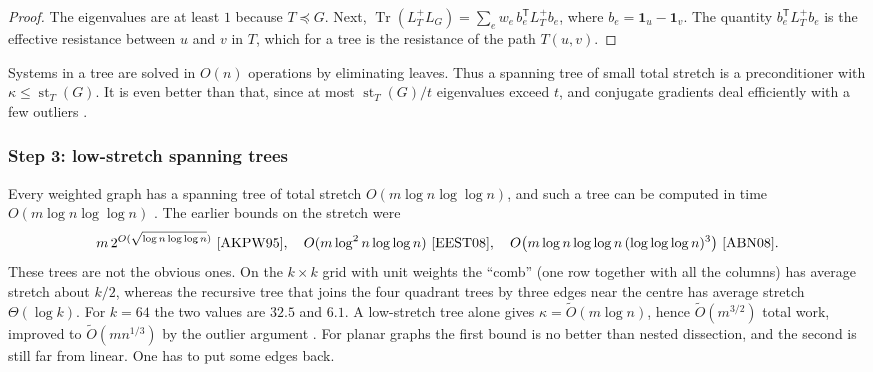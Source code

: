 \documentclass[11pt]{amsart}
\theoremstyle{definition}
\theoremstyle{remark}
\newcommand{\st}{\operatorname{st}}
\newcommand{\Tr}{\operatorname{Tr}}
\newcommand{\Ot}{\widetilde{O}}
\newcommand{\lo}{\preccurlyeq}
\begin{document}
\begin{proof}
The eigenvalues are at least $1$ because $T\lo G$. Next, $\Tr(L_T^{+}L_G)=\sum_ew_e\,b_e^{\mathsf T}L_T^{+}b_e$, where $b_e=\mathbf 1_u-\mathbf 1_v$. The quantity $b_e^{\mathsf T}L_T^{+}b_e$ is the effective resistance between $u$ and $v$ in $T$,
which for a tree is the resistance of the path $T(u,v)$.
\end{proof}

Systems in a tree are solved in $O(n)$ operations by eliminating leaves. Thus a spanning tree of small total stretch is a preconditioner with $\kappa\le\st_T(G)$. It is even better than that,
since at most $\st_T(G)/t$ eigenvalues exceed $t$, and conjugate gradients deal efficiently with a few outliers \cite{SW09}.

\subsubsection*{Step 3: low-stretch spanning trees}
Every weighted graph has a spanning tree of total stretch $O(m\log n\log\log n)$, and such a tree can be computed in time $O(m\log n\log\log n)$ \cite{AN12}.
The earlier bounds on the stretch were
\[
m\,2^{O(\sqrt{\log n\log\log n})}\ \text{\cite{AKPW95}},\quad O(m\log^2n\log\log n)\ \text{\cite{EEST08}},\quad O\bigl(m\log n\log\log n\,(\log\log\log n)^3\bigr)\ \text{\cite{ABN08}}.
\]
These trees are not the obvious ones. On the $k\times k$ grid with unit weights the ``comb'' (one row together with all the columns) has average stretch about $k/2$,
whereas the recursive tree that joins the four quadrant trees by three edges near the centre has average stretch $\Theta(\log k)$. For $k=64$ the two values are $32.5$ and $6.1$.
A low-stretch tree alone gives $\kappa=\Ot(m\log n)$, hence $\Ot(m^{3/2})$ total work, improved to $\Ot(mn^{1/3})$ by the outlier argument \cite{SW09}.
For planar graphs the first bound is no better than nested dissection, and the second is still far from linear. One has to put some edges back.
\end{document}
